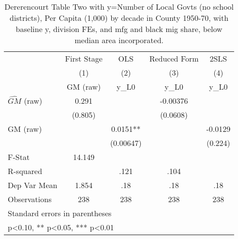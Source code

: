 \begin{table}[htbp]\centering
\def\sym#1{\ifmmode^{#1}\else\(^{#1}\)\fi}
\caption{Dererencourt Table Two with y=Number of Local Govts (no school districts), Per Capita (1,000) by decade in County 1950-70, with baseline y, division FEs, and mfg and black mig share, below median area incorporated.}
\begin{tabular}{l*{4}{c}}
\toprule
                    & First Stage   &         OLS   &Reduced Form   &        2SLS   \\
                    &\multicolumn{1}{c}{(1)}&\multicolumn{1}{c}{(2)}&\multicolumn{1}{c}{(3)}&\multicolumn{1}{c}{(4)}\\
                    &\multicolumn{1}{c}{GM  (raw)}&\multicolumn{1}{c}{y\_L0}&\multicolumn{1}{c}{y\_L0}&\multicolumn{1}{c}{y\_L0}\\
\midrule
$\hat{GM}$ (raw)    &       0.291   &               &    -0.00376   &               \\
                    &     (0.805)   &               &    (0.0608)   &               \\
\addlinespace
GM  (raw)           &               &      0.0151** &               &     -0.0129   \\
                    &               &   (0.00647)   &               &     (0.224)   \\
\midrule
F-Stat              &      14.149   &               &               &               \\
R-squared           &               &        .121   &        .104   &               \\
Dep Var Mean        &       1.854   &         .18   &         .18   &         .18   \\
Observations        &         238   &         238   &         238   &         238   \\
\bottomrule
\multicolumn{5}{l}{\footnotesize Standard errors in parentheses}\\
\multicolumn{5}{l}{\footnotesize * p<0.10, ** p<0.05, *** p<0.01}\\
\end{tabular}
\end{table}
